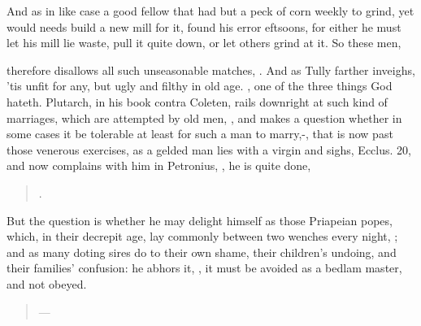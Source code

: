 And as in like case a good fellow that had but a peck of corn weekly to
grind, yet would needs build a new mill for it, found his error
eftsoons, for either he must let his mill lie waste, pull it quite
down, or let others grind at it. So these men, \etc{}

\Seneca therefore disallows all such unseasonable matches, . And as Tully farther inveighs,
'tis unfit for any, but ugly and filthy in old age. ,
one of the three things God hateth. Plutarch, in his book \textlatin{contra
Coleten}, rails downright at such kind of marriages, which are attempted
by old men, , and makes a question whether in some cases it be
tolerable at least for such a man to marry,-, that is now past those venerous exercises, as a gelded man
lies with a virgin and sighs, Ecclus.  20, and now complains with
him in Petronius, ,
he is quite done,
%
\begin{quote}%
.
\end{quote}%

But the question is whether he may delight himself as those Priapeian
popes, which, in their decrepit age, lay commonly between two wenches
every night, ;
and as many doting sires do to their own shame, their children's
undoing, and their families' confusion: he abhors it, , it must be avoided as a bedlam
master, and not obeyed.
%
\begin{quote}%
---
\end{quote}%

